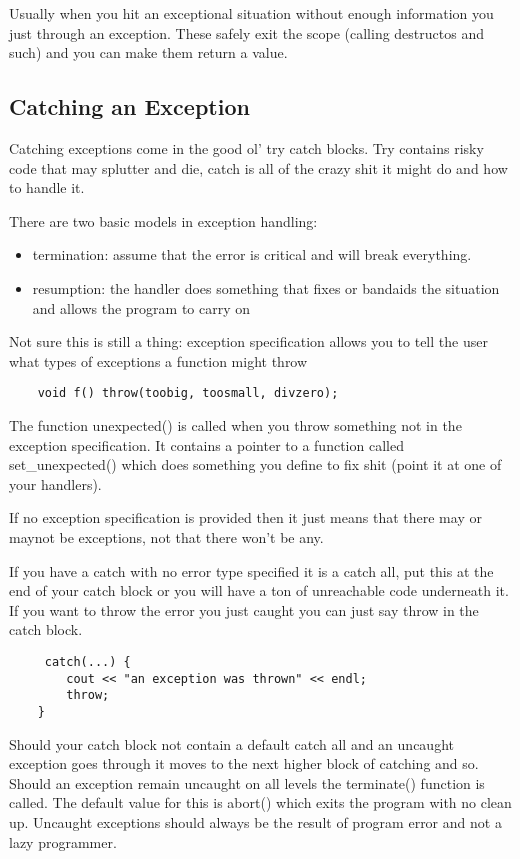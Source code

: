 \documentclass[12pt]{article}
\begin{document}
Usually when you hit an exceptional situation without enough information you just through an exception. These safely exit the scope (calling destructos and such) and you can make them return a value.

\subsection*{Catching an Exception}
Catching exceptions come in the good ol' try catch blocks. Try contains risky code that may splutter and die, catch is all of the crazy shit it might do and how to handle it.

There are two basic models in exception handling:
\begin{itemize}
    \item termination: assume that the error is critical and will break everything.
    \item resumption: the handler does something that fixes or bandaids the situation and allows the program to carry on
\end{itemize}

Not sure this is still a thing: exception specification allows you to tell the user what types of exceptions a function might throw
\begin{lstlisting}
    void f() throw(toobig, toosmall, divzero);
\end{lstlisting}
The function unexpected() is called when you throw something not in the exception specification. It contains a pointer to a function called set\_unexpected() which does something you define to fix shit (point it at one of your handlers).

If no exception specification is provided then it just means that there may or maynot be exceptions, not that there won't be any.

If you have a catch with no error type specified it is a catch all, put this at the end of your catch block or you will have a ton of unreachable code underneath it. If you want to throw the error you just caught you can just say throw in the catch block.
\begin{lstlisting}
     catch(...) {
        cout << "an exception was thrown" << endl;
        throw;
    }
 \end{lstlisting}
Should your catch block not contain a default catch all and an uncaught exception goes through it moves to the next higher block of catching and so. Should an exception remain uncaught on all levels the terminate() function is called. The default value for this is abort() which exits the program with no clean up. Uncaught exceptions should always be the result of program error and not a lazy programmer.
\end{document}
